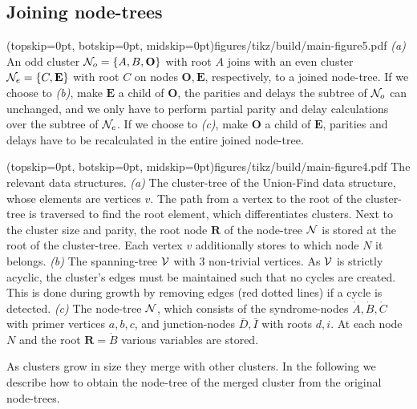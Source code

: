 \subsection{Joining node-trees}\label{sec:nodejoin}

\Figure[b](topskip=0pt, botskip=0pt, midskip=0pt){figures/tikz/build/main-figure5.pdf}{
    \emph{(a)} An odd cluster $\mathcal{N}_o=\{A, B, \mathbf{O}\}$ with root $A$ joins with an even cluster $\mathcal{N}_e=\{C, \mathbf{E}\}$ with root $C$ on nodes $\mathbf{O}, \mathbf{E}$, respectively, to a joined node-tree. If we choose to \emph{(b)}, make $\mathbf{E}$ a child of $\mathbf{O}$, the parities and delays the subtree of $\mathcal{N}_o$ can unchanged, and we only have to perform partial parity and delay calculations over the subtree of $\mathcal{N}_e$. If we choose to \emph{(c)}, make $\mathbf{O}$ a child of $\mathbf{E}$, parities and delays have to be recalculated in the entire joined node-tree. \label{fig:inversion}}

\Figure[tb](topskip=0pt, botskip=0pt, midskip=0pt){figures/tikz/build/main-figure4.pdf}{
    The relevant data structures. \emph{(a)} The cluster-tree of the Union-Find data structure, whose elements are vertices $v$. The path from a vertex to the root of the cluster-tree is traversed to find the root element, which differentiates clusters. Next to the cluster size and parity, the root node $\mathbf{R}$ of the node-tree $\mathcal{N}$ is stored at the root of the cluster-tree. Each vertex $v$ additionally stores to which node $N$ it belongs. \emph{(b)} The spanning-tree $\mathcal{V}$ with 3 non-trivial vertices. As $\mathcal{V}$ is strictly acyclic, the cluster's edges must be maintained such that no cycles are created. This is done during growth by removing edges (red dotted lines) if a cycle is detected. \emph{(c)} The node-tree $\mathcal{N}$, which consists of the syndrome-nodes $\dot{A}, \dot{B}, \dot{C}$ with primer vertices $a, b, c$, and junction-nodes $\bar{D}, \bar{I}$ with roots $d,i$. At each node $N$ and the root $\mathbf{R}=\dot{B}$ various variables are stored.\label{fig:nodetypes}}

As clusters grow in size they merge with other clusters. 
In the following we describe how to obtain the node-tree of the merged cluster from the original node-trees. %

